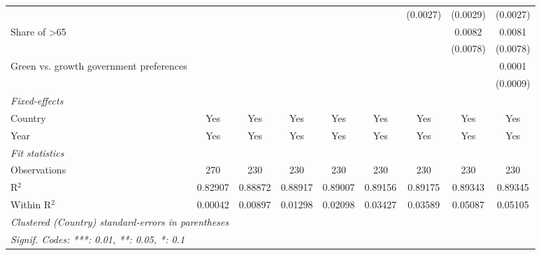 \begin{table}[htbp]
\begin{tabular}{lcccccccc}
                                                             &          &          &          &          &          & (0.0027) & (0.0029) & (0.0027)\\   
      Share of >65                                           &          &          &          &          &          &          & 0.0082   & 0.0081\\   
                                                             &          &          &          &          &          &          & (0.0078) & (0.0078)\\   
      Green vs. growth government preferences                &          &          &          &          &          &          &          & 0.0001\\   
                                                             &          &          &          &          &          &          &          & (0.0009)\\   
      \midrule
      \emph{Fixed-effects}\\
      Country                                                & Yes      & Yes      & Yes      & Yes      & Yes      & Yes      & Yes      & Yes\\  
      Year                                                   & Yes      & Yes      & Yes      & Yes      & Yes      & Yes      & Yes      & Yes\\  
      \midrule
      \emph{Fit statistics}\\
      Observations                                           & 270      & 230      & 230      & 230      & 230      & 230      & 230      & 230\\  
      R$^2$                                                  & 0.82907  & 0.88872  & 0.88917  & 0.89007  & 0.89156  & 0.89175  & 0.89343  & 0.89345\\  
      Within R$^2$                                           & 0.00042  & 0.00897  & 0.01298  & 0.02098  & 0.03427  & 0.03589  & 0.05087  & 0.05105\\  
      \midrule \midrule
      \multicolumn{9}{l}{\emph{Clustered (Country) standard-errors in parentheses}}\\
      \multicolumn{9}{l}{\emph{Signif. Codes: ***: 0.01, **: 0.05, *: 0.1}}\\
   \end{tabular}
\end{table}


